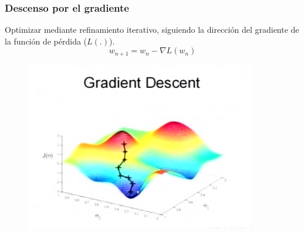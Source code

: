 \documentclass[10pt,center]{beamer}
\begin{document}
\begin{frame}
  \frametitle{Descenso por el gradiente}
    Optimizar mediante refinamiento iterativo, siguiendo la dirección del gradiente de la función de pérdida ($L(.)$).
  \begin{equation*}
    w_{n+1} = w_n - \nabla L(w_n)
  \end{equation*}
  \begin{figure}[h]
    \begin{center}
	    \includegraphics[height=0.4\textheight]{./img/gradient_descent_1.png}
    \end{center}
  \end{figure}
\end{frame}
\end{document}
